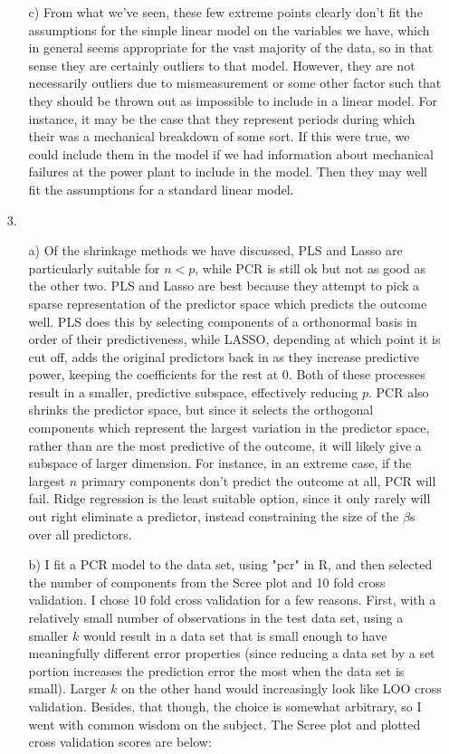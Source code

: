 \documentclass[11pt]{article}
\theoremstyle{definition}
\begin{document}
\begin{itemize}
\begin{itemize}
\begin{itemize}
                    
                \end{itemize}
            \item[c)]
                From what we've seen, these few extreme points clearly don't fit the assumptions for the simple linear model on the variables we have, which in general seems appropriate for the vast majority of the data, so in that sense they are certainly outliers to that model. However, they are not necessarily outliers due to mismeasurement or some other factor such that they should be thrown out as impossible to include in a linear model. For instance, it may be the case that they represent periods during which their was a mechanical breakdown of some sort. If this were true, we could include them in the model if we had information about mechanical failures at the power plant to include in the model. Then they may well fit the assumptions for a standard linear model. 
        \end{itemize}
    \item[3.]
        \begin{itemize}
            \item[a)]
                Of the shrinkage methods we have discussed, PLS and Lasso are particularly suitable for $n<p$, while PCR is still ok but not as good as the other two. PLS and Lasso are best because they attempt to pick a sparse representation of the predictor space which predicts the outcome well. PLS does this by selecting components of a orthonormal basis in order of their predictiveness, while LASSO, depending at which point it is cut off, adds the original predictors back in as they increase predictive power, keeping the coefficients for the rest at $0$. Both of these processes result in a smaller, predictive subspace, effectively reducing $p$. PCR also shrinks the predictor space, but since it selects the orthogonal components which represent the largest variation in the predictor space, rather than are the most predictive of the outcome, it will likely give a subspace of larger dimension. For instance, in an extreme case, if the largest $n$ primary components don't predict the outcome at all, PCR will fail. Ridge regression is the least suitable option, since it only rarely will out right eliminate a predictor, instead constraining the size of the $\beta$s over all predictors.
            \item[b)]
                I fit a PCR model to the data set, using "pcr" in R, and then selected the number of components from the Scree plot and 10 fold cross validation. I chose 10 fold cross validation for a few reasons. First, with a relatively small number of observations in the test data set, using a smaller $k$ would result in a data set that is small enough to have meaningfully different error properties (since reducing a data set by a set portion increases the prediction error the most when the data set is small). Larger $k$ on the other hand would increasingly look like LOO cross validation. Besides, that though, the choice is somewhat arbitrary, so I went with common wisdom on the subject. The Scree plot and plotted cross validation scores are below: \\

\end{itemize}
\end{itemize}
\end{document}
